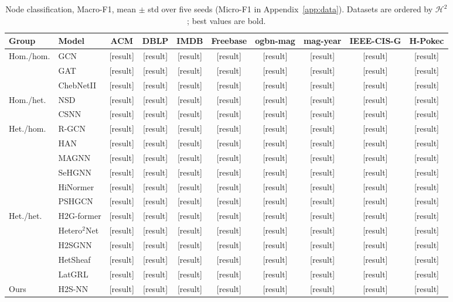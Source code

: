 \documentclass{article}
\newcommand{\method}{\textsc{H2S-NN}}
\newcommand{\res}{{\scriptsize[result]}}
\begin{document}
\begin{table}[t]
  \centering
  \caption{Node classification, Macro-F1, mean $\pm$ std over five seeds (Micro-F1 in Appendix~\ref{app:data}). Datasets are ordered by $\mathcal{H}^2$; best values are bold.}
  \label{tab:node-cls}
  \footnotesize
  \setlength{\tabcolsep}{4pt}
  \begin{tabular}{llcccccccc}
    \toprule
    \textbf{Group} & \textbf{Model} & ACM & DBLP & IMDB & Freebase & ogbn-mag & mag-year & IEEE-CIS-G & H-Pokec \\
    \midrule
    \multirow{3}{*}{Hom./hom.} & GCN & \res & \res & \res & \res & \res & \res & \res & \res \\
    & GAT & \res & \res & \res & \res & \res & \res & \res & \res \\
    & ChebNetII & \res & \res & \res & \res & \res & \res & \res & \res \\
    \midrule
    \multirow{2}{*}{Hom./het.} & NSD & \res & \res & \res & \res & \res & \res & \res & \res \\
    & CSNN & \res & \res & \res & \res & \res & \res & \res & \res \\
    \midrule
    \multirow{6}{*}{Het./hom.} & R-GCN & \res & \res & \res & \res & \res & \res & \res & \res \\
    & HAN & \res & \res & \res & \res & \res & \res & \res & \res \\
    & MAGNN & \res & \res & \res & \res & \res & \res & \res & \res \\
    & SeHGNN & \res & \res & \res & \res & \res & \res & \res & \res \\
    & HiNormer & \res & \res & \res & \res & \res & \res & \res & \res \\
    & PSHGCN & \res & \res & \res & \res & \res & \res & \res & \res \\
    \midrule
    \multirow{5}{*}{Het./het.} & H2G-former & \res & \res & \res & \res & \res & \res & \res & \res \\
    & Hetero$^2$Net & \res & \res & \res & \res & \res & \res & \res & \res \\
    & H2SGNN & \res & \res & \res & \res & \res & \res & \res & \res \\
    & HetSheaf & \res & \res & \res & \res & \res & \res & \res & \res \\
    & LatGRL & \res & \res & \res & \res & \res & \res & \res & \res \\
    \midrule
    Ours & \method{} & \res & \res & \res & \res & \res & \res & \res & \res \\
    \bottomrule
  \end{tabular}
\end{table}
\end{document}
